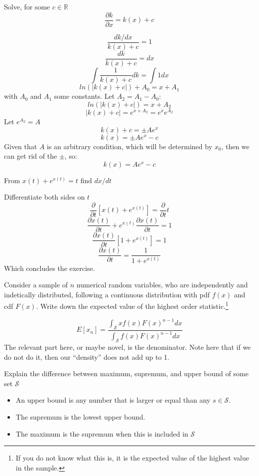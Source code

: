 \documentclass[a4paper,12pt,answers]{exam}
\begin{document}
{
\sffamily
\begin{questions}

\question Solve, for some $c\in\mathds{R}$ $$\frac{\partial k}{\partial x}=k(x)+c$$

    \begin{solutionorgrid}[11cm]
        $$\frac{dk/dx}{k(x)+c}=1$$
        $$\frac{dk}{k(x)+c}=dx$$
        $$\int \frac{1}{k(x)+c} dk=\int 1 dx$$
        $$ln(|k(x)+c|)+A_0 =  x + A_1$$
        with $A_0$ and $A_1$ some constants. Let $A_2=A_1-A_0$:
        $$ln(|k(x)+c|) =  x + A_2$$
        $$|k(x)+c|=e^{x+A_2}=e^xe^{A_2}$$
        Let $e^{A_2}=A$
        $$k(x)+c = \pm A e^x$$
        $$k(x)=\pm Ae^x - c$$
        Given that $A$ is an arbitrary condition, which will be determined by $x_0$, then we can get rid of the $\pm$, so:
        $$k(x)=Ae^x-c$$
    \end{solutionorgrid}

\question From $x(t)+e^{x(t)}=t$ find $dx/dt$

    \begin{solutionorgrid}[13cm]
        Differentiate both sides on $t$
        $$\frac{\partial}{\partial t} \left[x(t)+e^{x(t)}\right] =  \frac{\partial}{\partial t}t $$
        $$\frac{\partial x(t)}{\partial t} + e^{x(t)}\frac{\partial x(t)}{\partial t} = 1$$
        $$\frac{\partial x(t)}{\partial t}\left[1+e^{x(t)}\right] = 1$$
        $$\frac{\partial x(t)}{\partial t}=\frac{1}{1+e^{x(t)}}$$
        Which concludes the exercise.
    \end{solutionorgrid}

\question Consider a sample of $n$ numerical random variables, who are independently and indetically distributed, following a continuous distribution with pdf $f(x)$ and cdf $F(x)$. Write down the expected value of the highest order statistic.\footnote{If you do not know what this is, it is the expected value of the highest value in the sample.}

    \begin{solutionorgrid}[8cm]
        $$E[x_n] = \frac{\int_{\mathcal{S}} x f(x)F(x)^{n-1} dx}{\int_{\mathcal{S}} f(x)F(x)^{n-1} dx}$$
        The relevant part here, or maybe novel, is the denominator. Note here that if we do not do it, then our ``density'' does not add up to 1.
    \end{solutionorgrid}

\question Explain the difference between maximum, supremum, and upper bound of some set $\mathcal{S}$

    \begin{solutionorgrid}[6cm]
        \begin{itemize}
            \item An upper bound is any number that is larger or equal than any $s\in\mathcal{S}$.
            \item The supremum is the lowest upper bound.
            \item The maximum is the supremum when this is included in $\mathcal{S}$
        \end{itemize}        
    \end{solutionorgrid}



\end{questions}}
\end{document}
